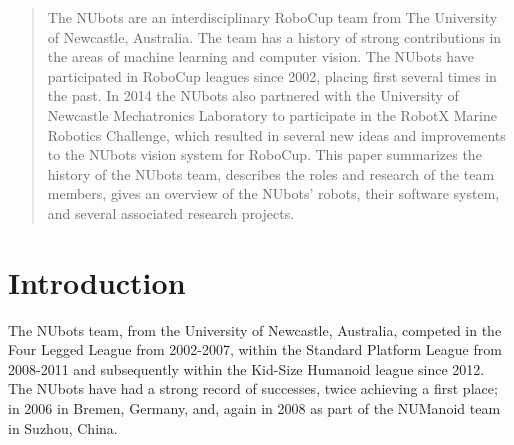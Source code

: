 \documentclass{llncs}
\begin{document}
\begin{abstract}
The NUbots are an interdisciplinary RoboCup team from The University of Newcastle, Australia. The team has a history of strong contributions in the areas of machine learning and computer vision. The NUbots have participated in RoboCup leagues since 2002, placing first several times in the past. In 2014 the NUbots also partnered with the University of Newcastle Mechatronics Laboratory to participate in the RobotX Marine Robotics Challenge, which resulted in several new ideas and improvements to the NUbots vision system for RoboCup. This paper summarizes the history of the NUbots team, describes the roles and research of the team members, gives an overview of the NUbots' robots, their software system, and several associated research projects.

\end{abstract}

%
\section{Introduction}
%
The NUbots team, from the University of Newcastle, Australia, competed in the Four Legged League from 2002-2007, within the Standard Platform League from 2008-2011 and subsequently within the Kid-Size Humanoid league since 2012. The NUbots have had a strong record of successes, twice achieving a first place; in 2006 in Bremen, Germany, and, again in 2008 as part of the NUManoid team in Suzhou, China.
\end{document}

